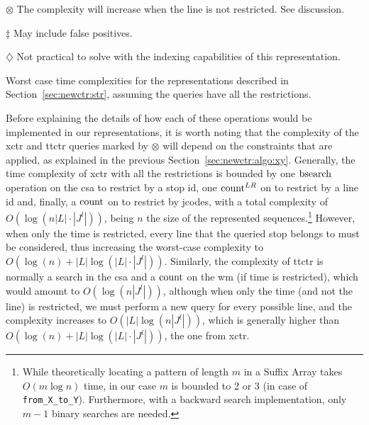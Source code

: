 \begin{threeparttable}
    \begin{tablenotes}
    \item[$\otimes$] The complexity will increase when the line is not restricted. See discussion.
    \item[$\ddagger$] May include false positives.
    \item[$\diamondsuit$] Not practical to solve with the indexing capabilities of this representation.
    \end{tablenotes}
    
    \caption{Worst case time complexities for the representations described in Section~\ref{sec:newctr:str}, assuming the queries have all the restrictions.}
    \label{tab:queries}
    \end{threeparttable}
    
    \medskip
    Before explaining the details of how each of these operations would be implemented in our representations, it is worth noting that the complexity of the \gls{xctr} and \gls{ttctr} queries marked by $\otimes$ will depend on the constraints that are applied, as explained in the previous Section~\ref{sec:newctr:algo:xy}. Generally, the time complexity of \gls{xctr} with all the restrictions is bounded by one $\operatorname{bsearch}$ operation on the \gls{csa} to restrict by a stop id, one $\operatorname{count}^{LR}$ on  to restrict by a line id and, finally, a $\operatorname{count}$ on  to restrict by jcodes, with a total complexity of $O(\log(n |L|\cdot |J^l|))$, being $n$ the size of the represented sequences.\footnote{While theoretically locating a pattern of length $m$ in a Suffix Array takes $O(m \log n)$ time, in our case $m$ is bounded to 2 or 3 (in case of \texttt{from\_X\_to\_Y}). Furthermore, with a backward search implementation, only $m-1$ binary searches are needed.}
    However, when only the time is restricted, every line that the queried stop belongs to must be considered, thus increasing the worst-case complexity to $O(\log(n) + |L|\log(|L|\cdot |J^l|))$. Similarly, the complexity of \gls{ttctr} is normally a search in the \gls{csa} and a $\operatorname{count}$ on the \gls{wm} (if time is restricted), which would amount to $O(\log(n|J^l|))$, although when only the time (and not the line) is restricted, we must perform a new query for every possible line, and the complexity increases to $O(|L|\log(n|J^l|))$, which is generally higher than $O(\log(n) + |L|\log(|L|\cdot |J^l|))$, the one from \gls{xctr}.
    

